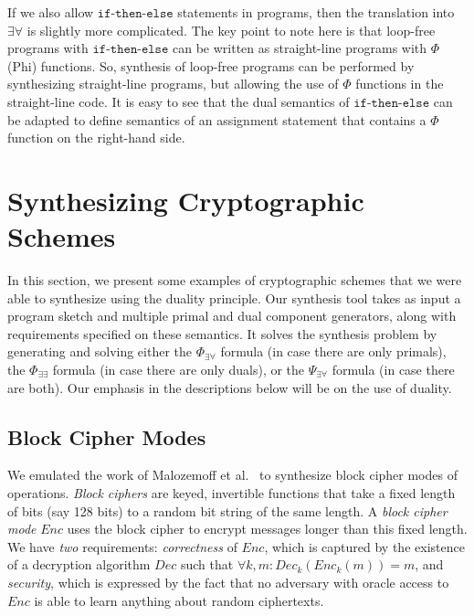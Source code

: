 \documentclass[preprint]{sig-alternate-05-2015}
\def\ite{{\texttt{if-then-else}}}
\begin{document}
{If we also allow $\ite$ statements in programs, then the
translation into $\exists\forall$ is slightly more
complicated.   The key point to note here is that
loop-free programs with $\ite$ can be written
as straight-line programs with $\Phi$ (Phi) functions.
So, synthesis of loop-free programs can be performed
by synthesizing straight-line programs, but allowing the
use of $\Phi$ functions in the straight-line code.
It is easy to see that the dual semantics of $\ite$
can be adapted to define semantics of an assignment
statement that contains a $\Phi$ function on the right-hand
side.



\endignore}


\section{Synthesizing Cryptographic Schemes}
\label{sec:application}

In this section, we present some examples of cryptographic schemes that we
were able to synthesize using the duality principle.
Our synthesis tool takes as input a program sketch and multiple primal 
and dual component generators, along with requirements
specified on these semantics. It solves the synthesis problem by
generating and solving either 
the $\Phi_{\exists\forall}$ formula (in case there are only primals),
the $\Phi_{\exists\exists}$ formula (in case there are only duals), or the 
$\Psi_{\exists\forall}$ formula (in case there are both).
Our emphasis in the descriptions below will be on the use of duality.

\subsection{Block Cipher Modes}

We emulated the work of Malozemoff et al.~\cite{DBLP:conf/csfw/MalozemoffKG14} to
synthesize block cipher modes of operations. {\em{Block ciphers}} are keyed, invertible
functions that take a fixed length of bits (say 128 bits) to a random bit string
of the same length. A {\em{block cipher mode}} $Enc$ uses the block cipher to encrypt
messages longer than this fixed length. We have {\em{two}} requirements:
{\em{correctness}} of $Enc$, which is captured by the
existence of a decryption algorithm $Dec$ such that $\forall k, m : Dec_k(
Enc_k( m ) ) = m$, and {\em{security}}, which is expressed by the fact that no adversary with
oracle access to $Enc$ is able to learn anything about random ciphertexts.
\end{document}
